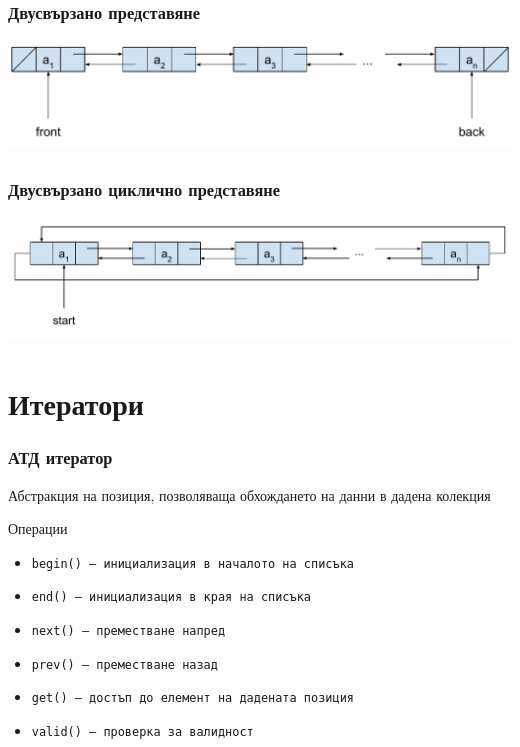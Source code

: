 \documentclass{beamer}
\begin{document}
\begin{frame}[label=doublelinked]
  \frametitle{Двусвързано представяне}

  \begin{center}
    \includegraphics[width=\textwidth]{images/double_linked_list.pdf}
  \end{center}
\end{frame}

\begin{frame}
  \frametitle{Двусвързано циклично представяне}

  \begin{center}
    \includegraphics[width=\textwidth]{images/double_linked_cyclic_list.pdf}
  \end{center}
\end{frame}

\section{Итератори}

\begin{frame}
  \frametitle{АТД итератор}

  Абстракция на позиция, позволяваща обхождането на данни в дадена колекция
  \vspace{1em}

  Операции
  \vspace{0.5em}
  \begin{itemize}
  \item \tt{begin()} -- инициализация в началото на списъка
  \item \tt{end()} -- инициализация в края на списъка
  \item \tt{next()} -- преместване напред
  \item \tt{prev()} -- преместване назад
  \item \tt{get()} -- достъп до елемент на дадената позиция
  \item \tt{valid()} -- проверка за валидност
  \end{itemize}
\end{frame}
\end{document}

